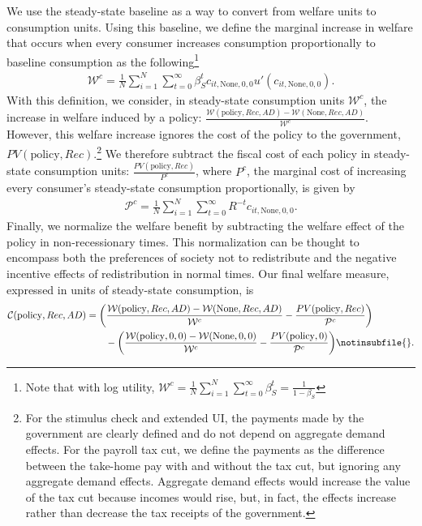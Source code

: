\documentclass[\econtexRoot/EGMN]{subfiles}
\begin{document}
We use the steady-state baseline as a way to convert from welfare units to consumption units. Using this baseline, we define the marginal increase in welfare that occurs when every consumer increases consumption proportionally to baseline consumption as the following\footnote{Note that with log utility, $\mathcal{W}^c =\frac{1}{N}\sum_{i=1}^{N} \sum_{t=0}^{\infty} \beta_S^t = \frac{1}{1-\beta_S}$}
\begin{align}
    \mathcal{W}^c =\frac{1}{N}\sum_{i=1}^{N} \sum_{t=0}^{\infty} \beta_S^t c_{it,\text{None},0,0} u'(c_{it,\text{None},0,0}) .
\end{align}
With this definition, we consider, in steady-state consumption units $\mathcal{W}^c$, the increase in welfare induced by a policy: $\frac{\mathcal{W}(\text{policy},Rec,AD)-\mathcal{W}(\text{None},Rec,AD)}{\mathcal{W}^c}$. However, this welfare increase ignores the cost of the policy to the government, $PV(\text{policy},Rec)$.\footnote{For the stimulus check and extended UI, the payments made by the government are clearly defined and do not depend on aggregate demand effects. For the payroll tax cut, we define the payments as the difference between the take-home pay with and without the tax cut, but ignoring any aggregate demand effects. Aggregate demand effects would increase the value of the tax cut because incomes would rise, but, in fact, the effects increase rather than decrease the tax receipts of the government.} We therefore subtract the fiscal cost of each policy in steady-state consumption units:  $\frac{PV(\text{policy},Rec)}{{P}^c}$, where ${P}^c$, the marginal cost of increasing every consumer's steady-state consumption proportionally, is given by
\begin{align}
    \mathcal{P}^c = \frac{1}{N}\sum_{i=1}^{N} \sum_{t=0}^{\infty} R^{-t} c_{it,\text{None},0,0} .
\end{align}
Finally, we normalize the welfare benefit by subtracting the welfare effect of the policy in non-recessionary times. This normalization can be thought to encompass both the preferences of society not to redistribute and the negative incentive effects of redistribution in normal times. Our final welfare measure, expressed in units of steady-state consumption, is
\begin{align}
    \mathcal{C}(\text{policy},Rec,AD) & = \bigg(\frac{\mathcal{W}(\text{policy},Rec,AD)-\mathcal{W}(\text{None},Rec,AD)}{\mathcal{W}^c} - \frac{PV(\text{policy},Rec)}{\mathcal{P}^c} \bigg) \nonumber \\
                                      & \qquad -
    \bigg(\frac{\mathcal{W}(\text{policy},0,0) - \mathcal{W}(\text{None},0,0)}{\mathcal{W}^c} - \frac{PV(\text{policy},0)}{\mathcal{P}^c} \bigg) \notinsubfile{\label{welfare_defn}}.
\end{align}
\end{document}
